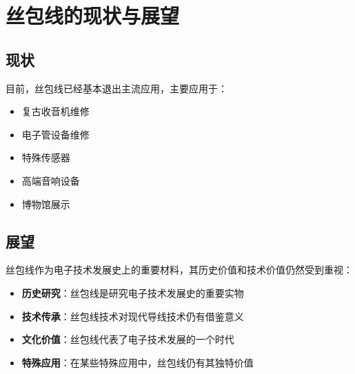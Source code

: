 \documentclass[12pt,UTF8]{ctexbook}
\begin{document}
\section{丝包线的现状与展望}

\subsection{现状}

目前，丝包线已经基本退出主流应用，主要应用于：

\begin{itemize}[leftmargin=2cm]
    \item 复古收音机维修
    \item 电子管设备维修
    \item 特殊传感器
    \item 高端音响设备
    \item 博物馆展示
\end{itemize}

\subsection{展望}

丝包线作为电子技术发展史上的重要材料，其历史价值和技术价值仍然受到重视：

\begin{itemize}[leftmargin=2cm]
    \item \textbf{历史研究}：丝包线是研究电子技术发展史的重要实物
    \item \textbf{技术传承}：丝包线技术对现代导线技术仍有借鉴意义
    \item \textbf{文化价值}：丝包线代表了电子技术发展的一个时代
    \item \textbf{特殊应用}：在某些特殊应用中，丝包线仍有其独特价值
\end{itemize}

\backmatter
\end{document}
